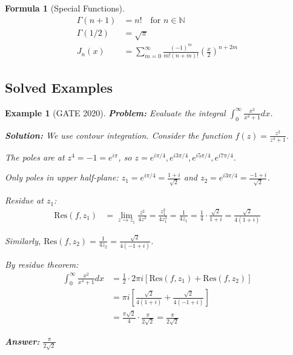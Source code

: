\documentclass[12pt,a4paper]{article}
\newtheorem{example}{Example}[section]
\newtheorem{formula}{Formula}[section]
\newcommand{\ans}[1]{\textcolor{red!70!black}{\textbf{Answer:} #1}}
\newcommand{\sol}{\textcolor{blue!70!black}{\textbf{Solution:}}}
\begin{document}
\begin{formula}[Special Functions]
\begin{align}
\Gamma(n+1) &= n! \quad \text{for } n \in \mathbb{N}\\
\Gamma(1/2) &= \sqrt{\pi}\\
J_n(x) &= \sum_{m=0}^{\infty} \frac{(-1)^m}{m!(n+m)!}\left(\frac{x}{2}\right)^{n+2m}
\end{align}
\end{formula}

\subsection{Solved Examples}

\begin{example}[GATE 2020]
\textbf{Problem:} Evaluate the integral $\int_0^{\infty} \frac{x^2}{x^4 + 1} dx$.

\sol
We use contour integration. Consider the function $f(z) = \frac{z^2}{z^4 + 1}$.

The poles are at $z^4 = -1 = e^{i\pi}$, so $z = e^{i\pi/4}, e^{i3\pi/4}, e^{i5\pi/4}, e^{i7\pi/4}$.

Only poles in upper half-plane: $z_1 = e^{i\pi/4} = \frac{1+i}{\sqrt{2}}$ and $z_2 = e^{i3\pi/4} = \frac{-1+i}{\sqrt{2}}$.

Residue at $z_1$:
\begin{align}
\text{Res}(f,z_1) &= \lim_{z \to z_1} \frac{z^2}{4z^3} = \frac{z_1^2}{4z_1^3} = \frac{1}{4z_1} = \frac{1}{4} \cdot \frac{\sqrt{2}}{1+i} = \frac{\sqrt{2}}{4(1+i)}
\end{align}

Similarly, $\text{Res}(f,z_2) = \frac{1}{4z_2} = \frac{\sqrt{2}}{4(-1+i)}$.

By residue theorem:
\begin{align}
\int_0^{\infty} \frac{x^2}{x^4 + 1} dx &= \frac{1}{2} \cdot 2\pi i \left[\text{Res}(f,z_1) + \text{Res}(f,z_2)\right]\\
&= \pi i \left[\frac{\sqrt{2}}{4(1+i)} + \frac{\sqrt{2}}{4(-1+i)}\right]\\
&= \frac{\pi\sqrt{2}}{4} \cdot \frac{\pi}{2\sqrt{2}} = \frac{\pi}{2\sqrt{2}}
\end{align}

\ans{$\frac{\pi}{2\sqrt{2}}$}
\end{example}
\end{document}
